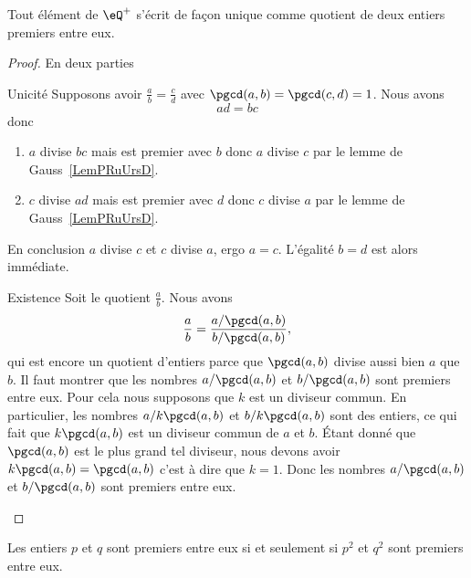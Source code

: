 \begin{theorem}     \label{THOooWYQVooRBaAAM}
    Tout élément de \( \eQ^+\) s'écrit de façon unique comme quotient de deux entiers premiers entre eux.
\end{theorem}

\begin{proof}
    En deux parties
    \begin{subproof}
        \item[Unicité]
            Supposons avoir \( \frac{ a }{ b }=\frac{ c }{ d }\) avec \( \pgcd(a,b)=\pgcd(c,d)=1\). Nous avons
            \begin{equation}
                ad=bc
            \end{equation}
            donc
            \begin{enumerate}
                \item
                    \( a\) divise \( bc\) mais est premier avec \( b\) donc \( a\) divise \( c\) par le lemme de Gauss~\ref{LemPRuUrsD}.
                \item
                    \( c\) divise \( ad\) mais est premier avec \( d\) donc \( c\) divise \( a\) par le lemme de Gauss~\ref{LemPRuUrsD}.
            \end{enumerate}
            En conclusion \( a\) divise \( c\) et \( c\) divise \( a\), ergo \( a=c\). L'égalité \( b=d\) est alors immédiate.
        \item[Existence]
            Soit le quotient \( \frac{ a }{ b }\). Nous avons
            \begin{equation}
                \frac{ a }{ b }=\frac{ a/\pgcd(a,b) }{ b/\pgcd(a,b) },
            \end{equation}
            qui est encore un quotient d'entiers parce que \( \pgcd(a,b)\) divise aussi bien \( a\) que \( b\). Il faut montrer que les nombres \( a/\pgcd(a,b)\) et \( b/\pgcd(a,b)\) sont premiers entre eux. Pour cela nous supposons que \( k\) est un diviseur commun. En particulier, les nombres \( a/k\pgcd(a,b)\) et \( b/k\pgcd(a,b)\) sont des entiers, ce qui fait que \( k\pgcd(a,b)\) est un diviseur commun de \( a\) et \( b\). Étant donné que \( \pgcd(a,b)\) est le plus grand tel diviseur, nous devons avoir \( k\pgcd(a,b)=\pgcd(a,b)\) c'est à dire que \( k=1\). Donc les nombres \( a/\pgcd(a,b)\) et \( b/\pgcd(a,b)\) sont premiers entre eux.
    \end{subproof}
\end{proof}

\begin{proposition}     \label{PROPooRZDDooLJabov}
    Les entiers \( p\) et \( q\) sont premiers entre eux si et seulement si \( p^2\) et \( q^2\) sont premiers entre eux.
\end{proposition}

